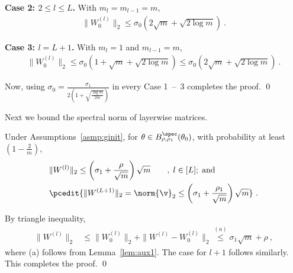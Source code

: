 \textbf{Case 2: $2\leq l \leq L$.}
With $m_l = m_{l-1} = m$,  
\begin{align*}
    \| W_{0}^{(l)} \|_2 \leq \sigma_0(2 \sqrt{m} + \sqrt{2\log m})~.
\end{align*}

\textbf{Case 3: $l=L+1$.}
With $m_l =1$ and $m_{l-1} = m$,  
\begin{align*}
    \| W_{0}^{(l)} \|_2 \leq \sigma_0(1  + \sqrt{m} + \sqrt{2\log m})\leq 
    \sigma_0(2 \sqrt{m} + \sqrt{2\log m})~.
\end{align*}

Now, using $\sigma_0 = \frac{\sigma_1}{2(1 + \sqrt{\frac{\log m}{2m}})}$  in every Case 1~--~3 completes the proof. \qed 

Next we bound the spectral norm of layerwise matrices. 
%
\begin{prop}
Under Assumptions~\ref{asmp:ginit}, for $\theta \in B_{\rho,\rho_1}^{\spec}(\theta_0)$,  with probability at least $\left(1 - \frac{2}{m} \right)$,
\begin{align*}
    &\| W^{(l)} \|_2 \leq \left(\sigma_1 + \frac{\rho}{\sqrt{m}}\right)\sqrt{m}\quad\quad,\; l\in[L];\; \text{and}\\
    &\pcedit{\| W^{(L+1)} \|_2 =\norm{\v}_2\leq \left(\sigma_1 + \frac{\rho_1}{\sqrt{m}}\right)\sqrt{m}}~.
\end{align*}
\label{prop:param-W-bound}
\end{prop}
\proof By triangle inequality,
\begin{align*}
\| W^{(l)} \|_2 & \leq \| W^{(l)}_0 \|_2 + \| W^{(l)} - W^{(l)}_0 \|_2 \overset{(a)}{\leq} \sigma_1 \sqrt{m} + \rho ~,     
\end{align*}
where (a) follows from Lemma~\ref{lem:aux1}. The case for $l+1$ follows similarly. This completes the proof. \qed 


